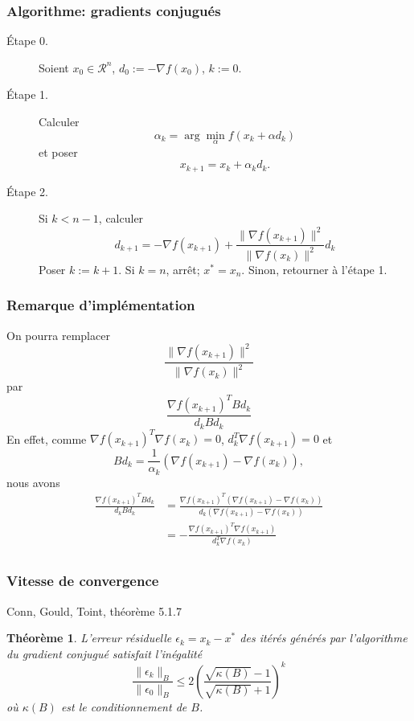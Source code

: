 \documentclass[usepdftitle=false]{beamer}
\newtheorem{thm}{Théorème}
\def\cR{\mathcal{R}}
\begin{document}
\begin{frame}
\frametitle{Algorithme: gradients conjugués}

\begin{description}
\item[Étape 0.]
Soient $x_0 \in \cR^n$, $d_0 := -\nabla f(x_0)$, $k := 0$.
\item[Étape 1.]
Calculer
$$
\alpha_k = \arg \min_{\alpha} f(x_k + \alpha d_k)
$$
et poser
$$
x_{k+1} = x_k + \alpha_k d_k.
$$
\item[Étape 2.]
Si $k < n-1$, calculer
$$
d_{k+1} = -\nabla f(x_{k+1}) + \frac{\| \nabla f(x_{k+1}) \|^2}{\| \nabla f(x_k) \|^2} d_k
$$
Poser $k := k+1$. Si $k = n$, arrêt; $x^* = x_n$. Sinon, retourner à l'étape 1.
\end{description}

\end{frame}

\begin{frame}
\frametitle{Remarque d'implémentation}

On pourra remplacer
$$
\frac{\| \nabla f(x_{k+1}) \|^2}{\| \nabla f(x_k) \|^2}
$$
par
$$
\frac{\nabla f(x_{k+1})^T B d_k}{d_k B d_k}
$$
En effet, comme
$\nabla f(x_{k+1})^T \nabla f(x_k) = 0$, $d_k^T \nabla f(x_{k+1}) = 0$ et
$$
B d_k = \frac{1}{\alpha_k} (\nabla f(x_{k+1}) - \nabla f(x_k)),
$$
nous avons
\begin{align*}
\frac{\nabla f(x_{k+1})^T B d_k}{d_k B d_k}
&= \frac{\nabla f(x_{k+1})^T (\nabla f(x_{k+1}) - \nabla f(x_k))}{d_k (\nabla f(x_{k+1}) - \nabla f(x_k))} \\
&= -\frac{\nabla f(x_{k+1})^T \nabla f(x_{k+1})}{d_k^T \nabla f(x_k)} \\
\end{align*}

\end{frame}

\begin{frame}
\frametitle{Vitesse de convergence}

Conn, Gould, Toint, théorème 5.1.7

\begin{thm}
L'erreur résiduelle $\epsilon_k = x_k - x^*$ des itérés générés par l'algorithme du gradient conjugué satisfait l'inégalité
$$
\frac{\| \epsilon_k \|_B}{\| \epsilon_0 \|_B}
\leq 2\left( \frac{\sqrt{\kappa(B)}-1}{\sqrt{\kappa(B)}+1} \right)^k
$$
où $\kappa(B)$ est le conditionnement de $B$.
\end{thm}

\end{frame}
\end{document}
